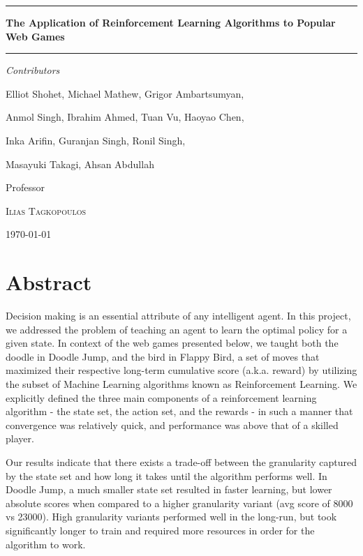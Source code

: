 \documentclass[a4paper, 12pt]{article}
\begin{document}
\begin{titlepage}
	\centering
    \rule{\textwidth}{1pt}

	\vspace{0.5cm}
	{\Huge\bfseries The Application of Reinforcement Learning Algorithms to Popular Web Games\par}
   	\vspace{0.5cm}
    \rule{\textwidth}{1pt}

    \vspace{1cm}
    {\Large\itshape Contributors\par}
    {Elliot Shohet, Michael Mathew, Grigor Ambartsumyan,

    Anmol Singh, Ibrahim Ahmed, Tuan Vu, Haoyao Chen,

    Inka Arifin, Guranjan Singh, Ronil Singh,

    Masayuki Takagi, Ahsan Abdullah

	}



	\vfill
	Professor\par
	\textsc{Ilias Tagkopoulos}

	{\today\par}
\end{titlepage}

\section*{Abstract}

Decision making is an essential attribute of any intelligent agent. In this project, we addressed the problem of teaching an agent to learn the optimal policy for a given state. In context of the web games presented below, we taught both the doodle in Doodle Jump, and the bird in Flappy Bird, a set of moves that maximized their respective long-term cumulative score (a.k.a. reward) by utilizing the subset of Machine Learning algorithms known as Reinforcement Learning. We explicitly defined the three main components of a reinforcement learning algorithm - the state set, the action set, and the rewards - in such a manner that convergence was relatively quick, and performance was above that of a skilled player.

Our results indicate that there exists a trade-off between the granularity captured by the  state set and how long it takes until the algorithm performs well. In Doodle Jump, a much smaller state set resulted in faster learning, but lower absolute scores when compared to a higher granularity variant (avg score of 8000 vs 23000). High granularity variants performed well in the long-run, but took significantly longer to train and required more resources in order for the algorithm to work.
\end{document}
